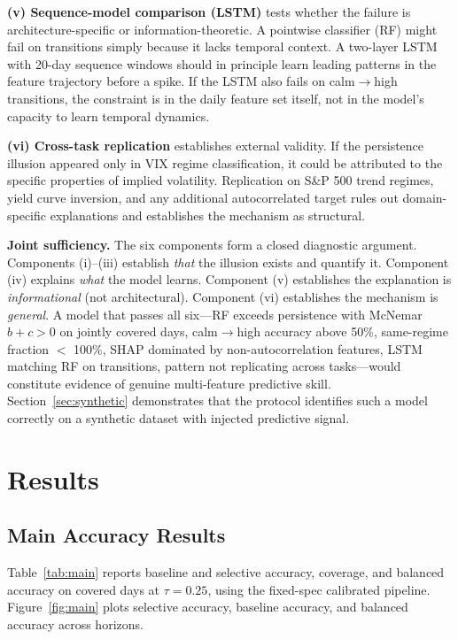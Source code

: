 \documentclass[11pt]{article}
\begin{document}
\textbf{(v) Sequence-model comparison (LSTM)} tests whether the failure is architecture-specific or information-theoretic. A pointwise classifier (RF) might fail on transitions simply because it lacks temporal context. A two-layer LSTM with 20-day sequence windows should in principle learn leading patterns in the feature trajectory before a spike. If the LSTM also fails on calm$\to$high transitions, the constraint is in the daily feature set itself, not in the model's capacity to learn temporal dynamics.

\textbf{(vi) Cross-task replication} establishes external validity. If the persistence illusion appeared only in VIX regime classification, it could be attributed to the specific properties of implied volatility. Replication on S\&P 500 trend regimes, yield curve inversion, and any additional autocorrelated target rules out domain-specific explanations and establishes the mechanism as structural.

\textbf{Joint sufficiency.} The six components form a closed diagnostic argument. Components (i)--(iii) establish \emph{that} the illusion exists and quantify it. Component (iv) explains \emph{what} the model learns. Component (v) establishes the explanation is \emph{informational} (not architectural). Component (vi) establishes the mechanism is \emph{general}. A model that passes all six---RF exceeds persistence with McNemar $b + c > 0$ on jointly covered days, calm$\to$high accuracy above 50\%, same-regime fraction $<$ 100\%, SHAP dominated by non-autocorrelation features, LSTM matching RF on transitions, pattern not replicating across tasks---would constitute evidence of genuine multi-feature predictive skill. Section~\ref{sec:synthetic} demonstrates that the protocol identifies such a model correctly on a synthetic dataset with injected predictive signal.

\section{Results}
\label{sec:results}

\subsection{Main Accuracy Results}
\label{sec:main}

Table~\ref{tab:main} reports baseline and selective accuracy, coverage, and balanced accuracy on covered days at $\tau = 0.25$, using the fixed-spec calibrated pipeline. Figure~\ref{fig:main} plots selective accuracy, baseline accuracy, and balanced accuracy across horizons.
\end{document}
